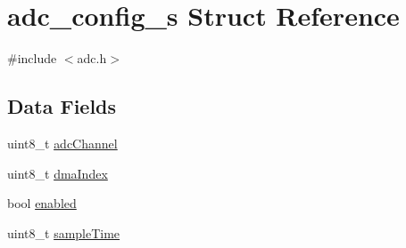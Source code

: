 \hypertarget{structadc__config__s}{\section{adc\+\_\+config\+\_\+s Struct Reference}
\label{structadc__config__s}
}


{\ttfamily \#include $<$adc.\+h$>$}

\subsection*{Data Fields}
\begin{DoxyCompactItemize}
\item 
uint8\+\_\+t \hyperlink{structadc__config__s_a0a1d73295fd9feb39b84ffba25547cff}{adc\+Channel}
\item 
uint8\+\_\+t \hyperlink{structadc__config__s_aeda4d4bb3b47c2f32be4e4cb985a083a}{dma\+Index}
\item 
bool \hyperlink{structadc__config__s_a773d02e807e2f68e386ca29665ea8b84}{enabled}
\item 
uint8\+\_\+t \hyperlink{structadc__config__s_a2bd63c6ed63d7597726383225674f566}{sample\+Time}
\end{DoxyCompactItemize}


